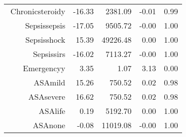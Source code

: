 \begin{tabular}{rrrrr}
$$  Chronic\-steroid\-y & -16.33 & 2381.09 & -0.01 & 0.99 \\ 
  Sepsis\-sepsis & -17.05 & 9505.72 & -0.00 & 1.00 \\ 
  Sepsis\-shock & 15.39 & 49226.48 & 0.00 & 1.00 \\ 
  Sepsis\-sirs & -16.02 & 7113.27 & -0.00 & 1.00 \\ 
  Emergency\-y & 3.35 & 1.07 & 3.13 & 0.00 \\ 
  ASA\-mild & 15.26 & 750.52 & 0.02 & 0.98 \\ 
  ASA\-severe & 16.62 & 750.52 & 0.02 & 0.98 \\ 
  ASA\-life & 0.19 & 5192.70 & 0.00 & 1.00 \\ 
  ASA\-none & -0.08 & 11019.08 & -0.00 & 1.00 \\ 
   \hline
\end{tabular}

